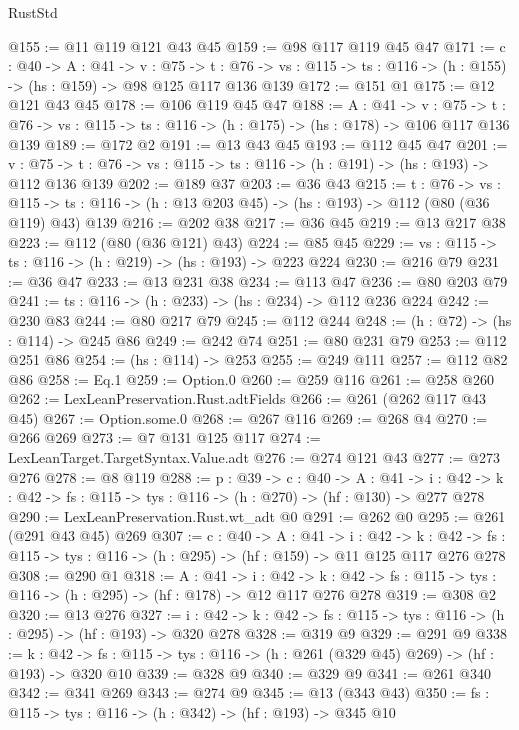 \begin{lexlean}{RustStd}
\begin{coremodule}
@155 := @11 @119 @121 @43 @45
@159 := @98 @117 @119 @45 @47
@171 := {c : @40} ->
  {A : @41} ->
  {v : @75} ->
  {t : @76} -> {vs : @115} -> {ts : @116} -> (h : @155) -> (hs : @159) -> @98 @125 @117 @136 @139
@172 := @151 @1
@175 := @12 @121 @43 @45
@178 := @106 @119 @45 @47
@188 := {A : @41} ->
  {v : @75} ->
  {t : @76} -> {vs : @115} -> {ts : @116} -> (h : @175) -> (hs : @178) -> @106 @117 @136 @139
@189 := @172 @2
@191 := @13 @43 @45
@193 := @112 @45 @47
@201 := {v : @75} ->
  {t : @76} -> {vs : @115} -> {ts : @116} -> (h : @191) -> (hs : @193) -> @112 @136 @139
@202 := @189 @37
@203 := @36 @43
@215 := {t : @76} ->
  {vs : @115} -> {ts : @116} -> (h : @13 @203 @45) -> (hs : @193) -> @112 (@80 (@36 @119) @43) @139
@216 := @202 @38
@217 := @36 @45
@219 := @13 @217 @38
@223 := @112 (@80 (@36 @121) @43)
@224 := @85 @45
@229 := {vs : @115} -> {ts : @116} -> (h : @219) -> (hs : @193) -> @223 @224
@230 := @216 @79
@231 := @36 @47
@233 := @13 @231 @38
@234 := @113 @47
@236 := @80 @203 @79
@241 := {ts : @116} -> (h : @233) -> (hs : @234) -> @112 @236 @224
@242 := @230 @83
@244 := @80 @217 @79
@245 := @112 @244
@248 := (h : @72) -> (hs : @114) -> @245 @86
@249 := @242 @74
@251 := @80 @231 @79
@253 := @112 @251 @86
@254 := (hs : @114) -> @253
@255 := @249 @111
@257 := @112 @82 @86
@258 := Eq.{1}
@259 := Option.{0}
@260 := @259 @116
@261 := @258 @260
@262 := LexLeanPreservation.Rust.adtFields
@266 := @261 (@262 @117 @43 @45)
@267 := Option.some.{0}
@268 := @267 @116
@269 := @268 @4
@270 := @266 @269
@273 := @7 @131 @125 @117
@274 := LexLeanTarget.TargetSyntax.Value.adt
@276 := @274 @121 @43
@277 := @273 @276
@278 := @8 @119
@288 := {p : @39} ->
  {c : @40} ->
  {A : @41} ->
  {i : @42} -> {k : @42} -> {fs : @115} -> {tys : @116} -> (h : @270) -> (hf : @130) -> @277 @278
@290 := LexLeanPreservation.Rust.wt_adt @0
@291 := @262 @0
@295 := @261 (@291 @43 @45) @269
@307 := {c : @40} ->
  {A : @41} ->
  {i : @42} ->
  {k : @42} -> {fs : @115} -> {tys : @116} -> (h : @295) -> (hf : @159) -> @11 @125 @117 @276 @278
@308 := @290 @1
@318 := {A : @41} ->
  {i : @42} ->
  {k : @42} -> {fs : @115} -> {tys : @116} -> (h : @295) -> (hf : @178) -> @12 @117 @276 @278
@319 := @308 @2
@320 := @13 @276
@327 := {i : @42} ->
  {k : @42} -> {fs : @115} -> {tys : @116} -> (h : @295) -> (hf : @193) -> @320 @278
@328 := @319 @9
@329 := @291 @9
@338 := {k : @42} ->
  {fs : @115} -> {tys : @116} -> (h : @261 (@329 @45) @269) -> (hf : @193) -> @320 @10
@339 := @328 @9
@340 := @329 @9
@341 := @261 @340
@342 := @341 @269
@343 := @274 @9
@345 := @13 (@343 @43)
@350 := {fs : @115} -> {tys : @116} -> (h : @342) -> (hf : @193) -> @345 @10

\end{coremodule}
\end{lexlean}
